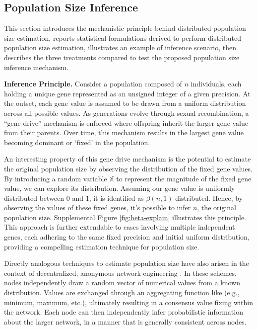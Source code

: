 \subsection{Population Size Inference}
\label{sec:population-size-inference}

This section introduces the mechanistic principle behind distributed population size estimation, reports statistical formulations derived to perform distributed population size estimation, illustrates an example of inference scenario, then describes the three treatments compared to test the proposed population size inference mechanism.

\textbf{Inference Principle.}
Consider a population composed of $n$ individuals, each holding a unique gene represented as an unsigned integer of a given precision.
At the outset, each gene value is assumed to be drawn from a uniform distribution across all possible values.
As generations evolve through sexual recombination, a ``gene drive'' mechanism is enforced where offspring inherit the larger gene value from their parents.
Over time, this mechanism results in the largest gene value becoming dominant or `fixed' in the population.

An interesting property of this gene drive mechanism is the potential to estimate the original population size by observing the distribution of the fixed gene values.
By introducing a random variable $\mathbb{X}$ to represent the magnitude of the fixed gene value, we can explore its distribution.
Assuming our gene value is uniformly distributed between 0 and 1, it is identified as $\beta(n, 1)$ \citep{gentle2009computational} distributed.
Hence, by observing the values of these fixed genes, it's possible to infer $n$, the original population size.
Supplemental Figure \ref{fig:beta-explain} illustrates this principle.
This approach is further extendable to cases involving multiple independent genes, each adhering to the same fixed precision and initial uniform distribution, providing a compelling estimation technique for population size.

Directly analogous techniques to estimate population size have also arisen in the context of decentralized, anonymous network engineering \citep{varagnolo2010distributed,hakan2012distributed}.
In these schemes, nodes independently draw a random vector of numerical values from a known distribution.
Values are exchanged through an aggregating function like (e.g., minimum, maximum, etc.), ultimately resulting in a consensus value fixing within the network.
Each node can then independently infer probabilistic information about the larger network, in a manner that is generally consistent across nodes.

